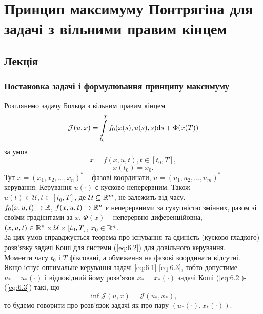 \setcounter{section}{6}


\section{Принцип максимуму Понтрягіна для задачі з вільними правим кінцем}

\subsection{Лекція}

\subsubsection{Постановка задачі і формулювання принципу максимуму}

Розглянемо задачу Больца з вільним правим кінцем
\begin{equation}
    \label{eq:6.1}
    \mathcal{J}(u, x) = \displaystyle\int\limits_{t_0}^T f_0 (x(s), u(s), s) \mathrm{d} s + \Phi(x(T))
\end{equation}
за умов
\begin{equation}
    \label{eq:6.2}
    \dot x = f(x, u, t), t \in [t_0, T],
\end{equation}
\begin{equation}
    \label{eq:6.3}
    x(t_0) = x_0.
\end{equation}
Тут $x = (x_1, x_2, \ldots, x_n)^*$ -- фазові координати, $u = (u_1, u_2, \ldots, u_m)^*$ -- керування. Керування $u(\cdot)$ є кусково-неперервним. Також $u(t) \in \mathcal{U}, t \in [t_0, T]$, де $\mathcal{U} \subseteq \mathbb{R}^m$, не залежить від часу. \\

$f_0(x, u, t) \to \mathbb{R}$, $f(x, u, t) \to \mathbb{R}^n$ є неперервними за сукупністю змінних, разом зі своїми градієнтами за $x$, $\Phi(x)$ -- неперервно диференційовна, $(x, u, t) \in \mathbb{R}^n \times \mathcal{U} \times [t_0, T]$, $x_0 \in \mathbb{R}^n$. \\

За цих умов справджується теорема про існування та єдиність (кусково-гладкого) розв'язку задачі Коші для системи (\ref{eq:6.2}) для довільного керування. \\

Моменти часу $t_0$ і $T$ фіксовані, а обмеження на фазові координати відсутні. \\

Якщо існує оптимальне керування задачі \ref{eq:6.1}-\ref{eq:6.3}, тобто допустиме $u_* = u_*(\cdot)$ і відповідний йому розв'язок $x_* = x_*(\cdot)$ задачі Коші (\ref{eq:6.2})-(\ref{eq:6.3}) такі, що
\begin{equation*}
    \inf \mathcal{J}(u, x) = \mathcal{J}(u_*, x_*),
\end{equation*}
то будемо говорити про розв'язок задачі як про пару $(u_*(\cdot), x_*(\cdot))$. \\

